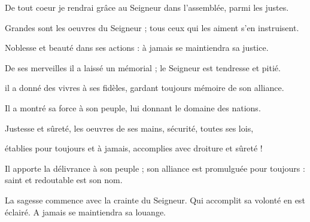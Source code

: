 \item De tout coeur je rendrai grâce au Seigneur dans l'assemblée, parmi les justes.

\item Grandes sont les oeuvres du Seigneur ; tous ceux qui les aiment s'en instruisent.

\item Noblesse et beauté dans ses actions : à jamais se maintiendra sa justice.

\item De ses merveilles il a laissé un mémorial ; le Seigneur est tendresse et pitié.

\item il a donné des vivres à ses fidèles, gardant toujours mémoire de son alliance.

\item Il a montré sa force à son peuple, lui donnant le domaine des nations.

\item Justesse et sûreté, les oeuvres de ses mains, sécurité, toutes ses lois,

\item établies pour toujours et à jamais, accomplies avec droiture et sûreté !

\item Il apporte la délivrance à son peuple ; son alliance est promulguée pour toujours : saint et redoutable est son nom.

\item La sagesse commence avec la crainte du Seigneur. Qui accomplit sa volonté en est éclairé. A jamais se maintiendra sa louange.
